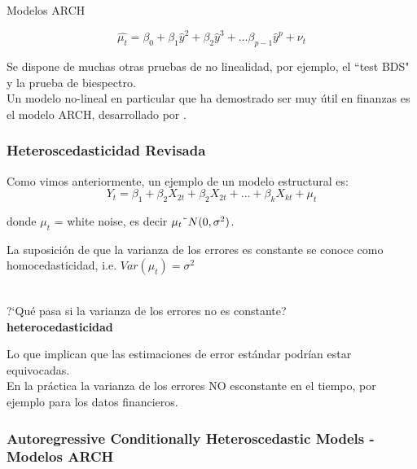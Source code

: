\documentclass[xcolor=(list of options)]{beamer}
\begin{document}
\begin{section}{Modelos ARCH}
\begin{frame}
\begin{equation}
\hat{\mu_t} = \beta_0 + \beta_1 \hat{y}^2+ \beta_2 \hat{y}^3+\dots{}\beta_{p-1} \hat{y}^p+ \nu_t
\end{equation}

Se dispone de muchas otras pruebas de no linealidad, por ejemplo, el ``test BDS" y la prueba de biespectro.\\
Un modelo no-lineal en particular que ha demostrado ser muy \'util en finanzas es el modelo ARCH, desarrollado por \cite{engle1982autoregressive}.

\end{frame}

\begin{frame}
\frametitle{Heteroscedasticidad Revisada}

Como vimos anteriormente, un ejemplo de un modelo estructural es:\\
\begin{equation}
Y_t = \beta_1 + \beta_2 X_{2t} + \beta_2 X_{2t} + \dots{} + \beta_k X_{kt} +\mu_t 
\end{equation}
\vspace{2mm}	

donde $\mu_t$ = white noise, es decir $\mu_t \string~N(0,\sigma^2)$.\\
\vspace{2mm}	

La suposici\'on de que la varianza de los errores es constante se conoce como homocedasticidad, i.e. $Var(\mu_t)=\sigma^2$\\
 \vspace{2mm}	

?`Qu\'e pasa si la varianza de los errores no es constante?\\

\textbf{heterocedasticidad}\\
\vspace{4mm}	

Lo que implican que las estimaciones de error est\'andar podr\'{i}an estar equivocadas.\\
En la pr\'actica  la varianza de los errores NO esconstante en el tiempo, por ejemplo para los datos financieros.

\end{frame}

\begin{frame}
\frametitle{Autoregressive Conditionally Heteroscedastic Models - Modelos ARCH }


\end{frame}
\end{section}
\end{document}
